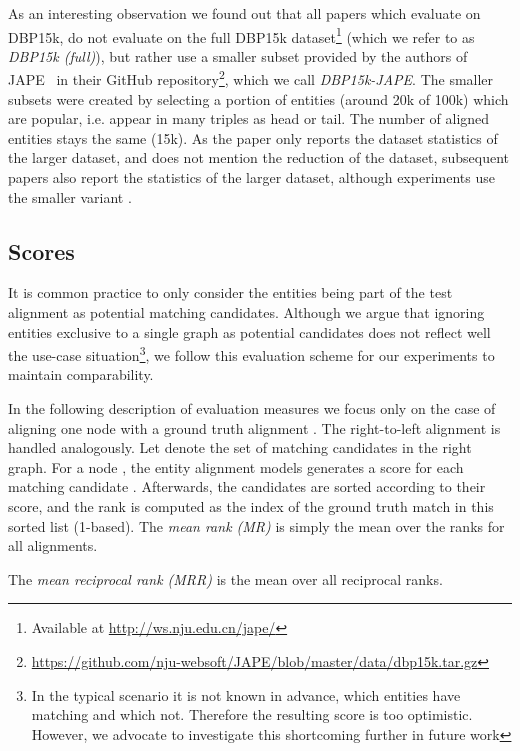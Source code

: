 \documentclass[runningheads]{llncs}
\begin{document}
As an interesting observation we found out that all papers which evaluate on DBP15k, do not evaluate on the full DBP15k dataset\footnote{Available at \url{http://ws.nju.edu.cn/jape/}} (which we refer to as \emph{DBP15k (full)}), but rather use a smaller subset provided by the authors of JAPE~\cite{DBLP:conf/semweb/SunHL17} in their GitHub repository\footnote{\url{https://github.com/nju-websoft/JAPE/blob/master/data/dbp15k.tar.gz}}, which we call \emph{DBP15k-JAPE}.
The smaller subsets were created by selecting a portion of entities (around 20k of 100k) which are popular, i.e. appear in many triples as head or tail.
The number of aligned entities stays the same (15k).
As the paper only reports the dataset statistics of the larger dataset, and does not mention the reduction of the dataset, subsequent papers
also report the statistics of the larger dataset, although experiments use the smaller variant \cite{DBLP:conf/semweb/SunHL17,sun2018bootstrapping,DBLP:conf/emnlp/WangLLZ18,DBLP:conf/acl/CaoLLLLC19,DBLP:conf/ijcai/ZhuXLS17}.

\subsection{Scores}
It is common practice to only consider the entities being part of the test alignment as potential matching candidates.
Although we argue that ignoring entities exclusive to a single graph as potential candidates does not reflect well the use-case situation\footnote{In the typical scenario it is not known in advance, which entities have matching and which not. Therefore the resulting score is too optimistic. However, we advocate to investigate this shortcoming further in future work}, we follow this evaluation scheme for our experiments to maintain comparability.

In the following description of evaluation measures we focus only on the case of aligning one node  with a ground truth alignment .
The right-to-left alignment is handled analogously.
Let  denote the set of matching candidates in the right graph.
For a node , the entity alignment models generates a score  for each matching candidate .
Afterwards, the candidates are sorted according to their score, and the rank  is computed as the index of the ground truth match  in this sorted list (1-based).
The \emph{mean rank (MR)} is simply the mean over the ranks for all alignments.

The \emph{mean reciprocal rank (MRR)} is the mean over all reciprocal ranks.
\end{document}
